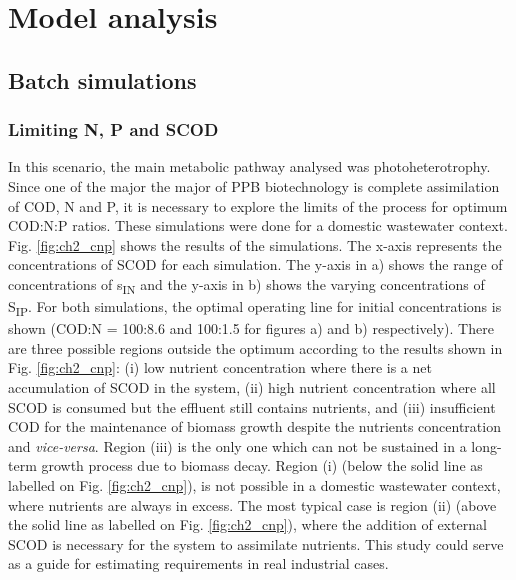 \section{Model analysis}
\subsection{Batch simulations}

\subsubsection{Limiting N, P and SCOD}
In this scenario, the main metabolic pathway analysed was photoheterotrophy. Since one of the major the major of PPB biotechnology is complete assimilation of COD, N and P, it is necessary to explore the limits of the process for optimum COD:N:P ratios. These simulations were done for a domestic wastewater context.
\skippingparagraph
Fig. \ref{fig:ch2_cnp} shows the results of the simulations. 
The x-axis represents the concentrations of SCOD for each simulation. The y-axis in a) shows the range of concentrations of s\textsubscript{IN} and the y-axis in b) shows the varying concentrations of S\textsubscript{IP}.
For both simulations, the optimal operating line for initial concentrations is shown (COD:N = 100:8.6 and 100:1.5 for figures a) and b) respectively). There are three possible regions outside the optimum according to the results shown in Fig. \ref{fig:ch2_cnp}: (i) low nutrient concentration where there is a net accumulation of SCOD in the system, (ii) high nutrient concentration where all SCOD is consumed but the effluent still contains nutrients, and (iii) insufficient COD for the maintenance of biomass growth despite the nutrients concentration and \textit{vice-versa}. Region (iii) is the only one which can not be sustained in a long-term growth process due to biomass decay. Region (i) (below the solid line as labelled on Fig. \ref{fig:ch2_cnp}), is not possible in a domestic wastewater context, where nutrients are always in excess. The most typical case is region (ii) (above the solid line as labelled on Fig. \ref{fig:ch2_cnp}), where the addition of external SCOD is necessary for the system to assimilate nutrients. This study could serve as a guide for estimating requirements in real industrial cases.  



